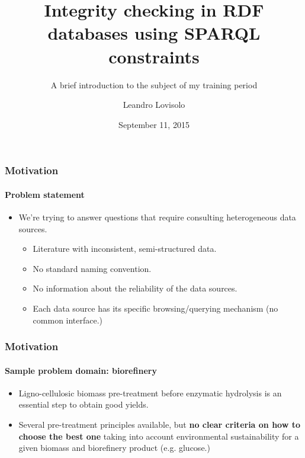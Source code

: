 \documentclass{beamer}
\title{Integrity checking in RDF databases using SPARQL constraints}
\subtitle{
  A brief introduction to the subject of my training period
}
\author{
  Leandro Lovisolo
}
\date{September 11, 2015}
\institute{
  INRA SupAgro and INRIA GraphiK \\
  Montpellier, France
}
\begin{document}
\begin{frame}
  \titlepage
\end{frame}

\begin{frame}
  \frametitle{Motivation}
  \framesubtitle{Problem statement}

  \pause

  \begin{itemize}
    \item We're trying to answer questions that require consulting
      heterogeneous data sources.

    \pause

    \begin{itemize}
      \item Literature with inconsistent, semi-structured data.

      \pause

      \item No standard naming convention.

      \pause

      \item No information about the reliability of the data sources.

      \pause

      \item Each data source has its specific browsing/querying mechanism (no
        common interface.)
    \end{itemize}
  \end{itemize}
\end{frame}

\begin{frame}
  \frametitle{Motivation}
  \framesubtitle{Sample problem domain: \textbf{biorefinery}}

  \begin{itemize}
    \item Ligno-cellulosic biomass pre-treatment before enzymatic hydrolysis is
      an essential step to obtain good yields.

    \pause

    \item Several pre-treatment principles available, but \textbf{no clear
      criteria on how to choose the best one} taking into account environmental
      sustainability for a given biomass and biorefinery product (e.g.
      glucose.)
  \end{itemize}
\end{frame}
\end{document}
